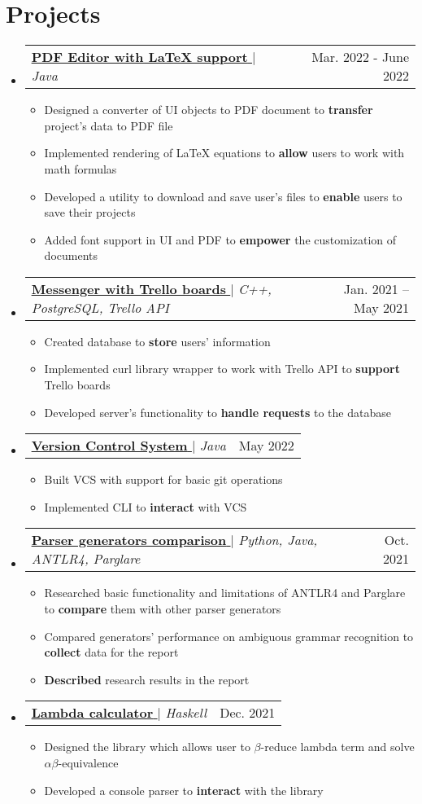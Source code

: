 \documentclass[english,russian,letterpaper,11pt]{article}
\makeatletter
\newcommand{\resumeItem}[1]{
  \item\small{
    {#1 \vspace{-2pt}}
  }
}
\newcommand{\resumeProjectHeading}[2]{
    \item
    \begin{tabular*}{0.97\textwidth}{l@{\extracolsep{\fill}}r}
      \small#1 & #2 \\
    \end{tabular*}\vspace{-7pt}
}
\newcommand{\resumeSubHeadingListStart}{\begin{itemize}[leftmargin=0.15in, label={}]}
\newcommand{\resumeSubHeadingListEnd}{\end{itemize}}
\newcommand{\resumeItemListStart}{\begin{itemize}}
\newcommand{\resumeItemListEnd}{\end{itemize}\vspace{-5pt}}
\makeatother
\begin{document}
\section{Projects}
    \resumeSubHeadingListStart
    \resumeProjectHeading
          {\href{https://github.com/Pdf-Creator/pdf-editor}{\underline{\textbf{PDF Editor with \LaTeX \xspace support}} \faGithub} $|$ \emph{Java}}{Mar. 2022 - June 2022}
          \resumeItemListStart
            \resumeItem{Designed a converter of UI objects to PDF document to \textbf{transfer} project's data to PDF file}
            \resumeItem{Implemented rendering of \LaTeX \xspace equations to \textbf{allow} users to work with math formulas}
            \resumeItem{Developed a utility to download and save user's files to \textbf{enable} users to save their projects}
            \resumeItem{Added font support in UI and PDF to \textbf{empower} the customization of documents}
          \resumeItemListEnd
    \resumeProjectHeading
    {\href{https://github.com/alexbuyan/BPKproject}{\underline{\textbf{Messenger with Trello boards}} \faGithub} $|$ \emph{C++, PostgreSQL, Trello API}}{Jan. 2021 -- May 2021}
    \resumeItemListStart
      \resumeItem{Created database to \textbf{store} users' information}
      \resumeItem{Implemented curl library wrapper to work with Trello API to \textbf{support} Trello boards}
      \resumeItem{Developed server's functionality to \textbf{handle requests} to the database}
    \resumeItemListEnd
    \resumeProjectHeading
        {\href{https://github.com/alexbuyan/VCS}{\underline{\textbf{Version Control System}} \faGithub} $|$ \emph{Java}}{May 2022}
        \resumeItemListStart
          \resumeItem{Built VCS with support for basic git operations}
          \resumeItem{Implemented CLI to \textbf{interact} with VCS}
        \resumeItemListEnd
    \resumeProjectHeading
    {\href{https://github.com/Parser-Comparison/Parser-Comparison}{\underline{\textbf{Parser generators comparison}} \faGithub} $|$ \emph{Python, Java, ANTLR4, Parglare}}{Oct. 2021}
    \resumeItemListStart
    \resumeItem{Researched basic functionality and limitations of ANTLR4 and Parglare to \textbf{compare} them with other parser generators } \\
    \resumeItem{Compared generators' performance on ambiguous grammar recognition to \textbf{collect} data for the report} \\
    \resumeItem{\textbf{Described} research results in the report}
    \resumeItemListEnd
    \resumeProjectHeading
        {\href{https://github.com/alexbuyan/LambdaCalculator}{\underline{\textbf{Lambda calculator}} \faGithub} $|$ \emph{Haskell}}{Dec. 2021}
        \resumeItemListStart
          \resumeItem{Designed the library which allows user to $\beta$-reduce lambda term and solve $\alpha \beta$-equivalence} \\
          \resumeItem{Developed a console parser to \textbf{interact} with the library}
        \resumeItemListEnd
    \resumeSubHeadingListEnd
\end{document}
